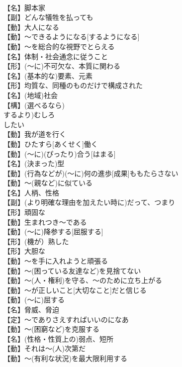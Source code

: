 \documentclass[8pt]{extreport}
\begin{document}
\begin{CJK}{UTF8}{min}
\\	【名】脚本家
\\	【副】どんな犠牲を払っても
\\	【動】大人になる
\\	【動】～できるようになる[するようになる]
\\	【動】～を総合的な視野でとらえる
\\	【名】体制・社会通念に従うこと
\\	【形】(～に)不可欠な、本質に関わる
\\	【名】(基本的な)要素、元素
\\	【形】均質な、同種のものだけで構成された
\\	【名】(地域)社会
\\	【構】(選べるなら)
\\	するより)むしろ
\\	したい
\\	【動】我が道を行く
\\	【動】ひたすら[あくせく]働く
\\	【動】(～に)(ぴったり)合う[はまる]
\\	【名】(決まった)型
\\	【動】(行為などが)(～に)何の進歩[成果]ももたらさない
\\	【動】～(親など)に似ている
\\	【名】人柄、性格
\\	【副】(より明確な理由を加えたい時に)だって、つまり
\\	【形】頑固な
\\	【動】生まれつき～である
\\	【動】(～に)降参する[屈服する]
\\	【形】(機が）熟した
\\	【形】大胆な
\\	【動】～を手に入れようと頑張る
\\	【動】～(困っている友達など)を見捨てない
\\	【動】～(人・権利)を守る、～のために立ち上がる
\\	【動】～が正しいこと[大切なこと]だと信じる
\\	【動】(～に)屈する
\\	【名】脅威、脅迫
\\	【定】～でありさえすればいいのになあ
\\	【動】～(困窮など)を克服する
\\	【名】(性格・性質上の)弱点、短所
\\	【動】それは～(人)次第だ
\\	【動】～(有利な状況)を最大限利用する

\end{CJK}
\end{document}
